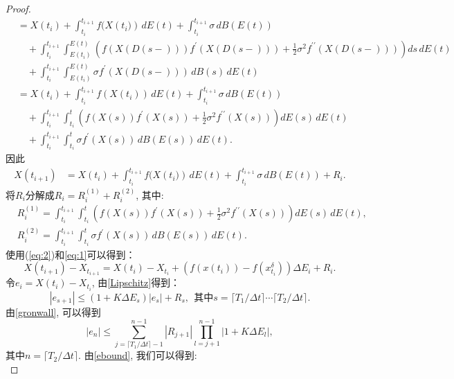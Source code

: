 \begin{proof}
\begin{align*}
		&= X(t_i) + \int_{t_i}^{t_{i+1}} f(X({t_i)}) \, dE(t) + \int_{t_i}^{t_{i+1}} \sigma \, dB(E(t)) \\
		&\quad + \int_{t_i}^{t_{i+1}} \int_{E(t_i)}^{E(t)} \left( f(X(D(s-))) f^{\prime}(X(D(s-))) + \frac{1}{2} \sigma^2 f^{\prime\prime}(X(D(s-))) \right) ds \, dE(t) \\
		&\quad + \int_{t_i}^{t_{i+1}} \int_{E(t_i)}^{E(t)}\sigma f^{\prime}(X(D(s-))) \, dB(s) \, dE(t)\\
		&= X(t_i) + \int_{t_i}^{t_{i+1}} f(X({t_i})) \, dE(t) + \int_{t_i}^{t_{i+1}} \sigma \, dB(E(t)) \\
		&\quad + \int_{t_i}^{t_{i+1}} \int_{t_i}^{t} \left( f(X(s)) f^{\prime}(X(s)) + \frac{1}{2} \sigma^2 f^{\prime\prime}(X(s)) \right) dE(s) \, dE(t) \\
		&\quad + \int_{t_i}^{t_{i+1}} \int_{t_i}^{t}\sigma f^{\prime}(X(s)) \, dB(E(s)) \, dE(t). 
	\end{align*}
	因此
	\begin{align}\label{eq:2}
		X(t_{i+1})
		&= X(t_i) + \int_{t_i}^{t_{i+1}} f(X({t_i)}) \, dE(t) + \int_{t_i}^{t_{i+1}} \sigma \, dB(E(t)) + R_i. 
	\end{align}
	将$R_i$分解成$R_i = R_i^{(1)} + R_i^{(2)}$, 其中:
	\begin{align*}
		& R_i^{(1)} = \int_{t_i}^{t_{i+1}} \int_{t_i}^{t} \left( f(X(s)) f^{\prime}(X(s)) + \frac{1}{2} \sigma^2 f^{\prime\prime}(X(s)) \right) dE(s) \, dE(t), \\
		& R_i^{(2)} = \int_{t_i}^{t_{i+1}} \int_{t_i}^{t} \sigma f^{\prime}(X(s)) \, dB(E(s)) \, dE(t). 
	\end{align*}
	使用(\ref{eq:2})和\eqref{eq:1}可以得到：
	\begin{equation}
		X({t_{i+1}})-X_{t_{i+1}}=X({t_i})-X_{t_i}+(f{(x({t_i}))}-f{(x^\delta_{t_i})})\Delta E_{i}+R_{i}. 
	\end{equation}
	令$e_i = X({t_i})-X_{t_i}$, 由\cref{Lipschitz}得到：
	\begin{equation}
		|e_{s+1}|\leq(1+K{\Delta}E_{s})|e_{s}|+R_{s}, ~~\text{其中}s=\lceil T_1/\Delta t \rceil\cdots \lceil T_2 /\Delta t \rceil. 
	\end{equation}
	由\cref{gronwall}, 可以得到
	\begin{equation*}
		|e_n| \leq \sum\limits_{j=\lceil T_1/\Delta t \rceil-1}^{n-1}|R_{j+1}|\prod\limits_{l=j+1}^{n-1}|1+K\Delta E_l|, 
	\end{equation*}
	其中$n = \lceil T_2/\Delta t \rceil$. 由\cref{ebound}, 我们可以得到:	
	\begin{equation*}

\end{equation*}
\end{proof}
